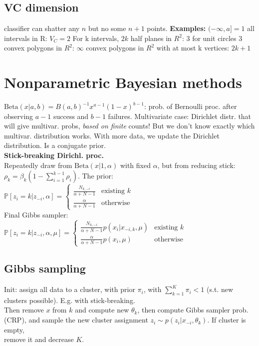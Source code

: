 \subsection*{VC dimension}
classifier can shatter any $n$ but no some $n{+}1$ points.
 \textbf{Examples:}
$(-\infty, a] =1$ 
all intervals in R: $V_C{=}2$
For k intervals, $2k$
half planes in $R^2$: $3$
for unit circles $3$
convex polygons in $R^2$: $\infty$
convex polygons in $R^2$ with at most k vertices: $2k+1$

\section*{Nonparametric Bayesian methods}
$\text{Beta}(x|a,b)=B(a,b)^{-1} x^{a-1}(1-x)^{b-1}$: prob. of Bernoulli proc. after observing $a-1$ success and $b-1$ failures. Multivariate case: Dirichlet distr. that will give multivar. probs, \textit{based on finite} counts! But we don't know exactly which multivar. distribution works. With more data, we update the Dirichlet distribution. Is a conjugate prior.\\
\textbf{Stick-breaking Dirichl. proc.} \\ Repeatedly draw from $\text{Beta}(x|1,\alpha)$ with fixed $\alpha$, but from reducing stick: $\rho_k=\beta_k(1-\sum_{i=1}^{k-1}\rho_i)$. The prior:\\
$\mathbb{P}[z_i=k|z_{-i},\alpha]=\begin{cases}\frac{N_{k,-i}}{\alpha+N-1} & \text{existing }k \\ \frac{\alpha}{\alpha+N-1} & \text{otherwise}\end{cases}$ \\
Final Gibbs sampler:\\
$\mathbb{P}[z_i=k|z_{-i},\alpha,\mu]=\begin{cases}\frac{N_{k,-i}}{\alpha+N-1}p(x_i|x_{-i,k},\mu) & \text{existing }k \\ \frac{\alpha}{\alpha+N-1}p(x_i,\mu) & \text{otherwise}\end{cases}$

\subsection*{Gibbs sampling}
Init: assign all data to a cluster, with prior $\pi_i$, with $\sum_{k=1}^K\pi_i<1$ (s.t. new clusters possible). E.g. with stick-breaking. \\
Then remove $x$ from $k$ and compute new $\theta_k$, then compute Gibbs sampler prob. (CRP), and sample the new cluster assignment $z_i\sim p(z_i|x_{-i},\theta_k)$. If cluster is empty, \\
remove it and decrease $K$.